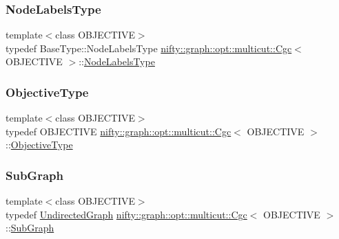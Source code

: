 \subsubsection{\texorpdfstring{Node\+Labels\+Type}{NodeLabelsType}}
{\footnotesize\ttfamily template$<$class O\+B\+J\+E\+C\+T\+I\+VE$>$ \\
typedef Base\+Type\+::\+Node\+Labels\+Type \hyperlink{classnifty_1_1graph_1_1opt_1_1multicut_1_1Cgc}{nifty\+::graph\+::opt\+::multicut\+::\+Cgc}$<$ O\+B\+J\+E\+C\+T\+I\+VE $>$\+::\hyperlink{classnifty_1_1graph_1_1opt_1_1multicut_1_1Cgc_a19f52bf3f00bed2816bd44604b94e7af}{Node\+Labels\+Type}}

\mbox{\label{classnifty_1_1graph_1_1opt_1_1multicut_1_1Cgc_aa83ae7cd167c0580c61f1d4eab63eb9a}} 
\subsubsection{\texorpdfstring{Objective\+Type}{ObjectiveType}}
{\footnotesize\ttfamily template$<$class O\+B\+J\+E\+C\+T\+I\+VE$>$ \\
typedef O\+B\+J\+E\+C\+T\+I\+VE \hyperlink{classnifty_1_1graph_1_1opt_1_1multicut_1_1Cgc}{nifty\+::graph\+::opt\+::multicut\+::\+Cgc}$<$ O\+B\+J\+E\+C\+T\+I\+VE $>$\+::\hyperlink{classnifty_1_1graph_1_1opt_1_1multicut_1_1Cgc_aa83ae7cd167c0580c61f1d4eab63eb9a}{Objective\+Type}}

\mbox{\label{classnifty_1_1graph_1_1opt_1_1multicut_1_1Cgc_a52317a6524a87782b8c6cc8cd27fa9fc}} 
\subsubsection{\texorpdfstring{Sub\+Graph}{SubGraph}}
{\footnotesize\ttfamily template$<$class O\+B\+J\+E\+C\+T\+I\+VE$>$ \\
typedef \hyperlink{classnifty_1_1graph_1_1UndirectedGraph}{Undirected\+Graph} \hyperlink{classnifty_1_1graph_1_1opt_1_1multicut_1_1Cgc}{nifty\+::graph\+::opt\+::multicut\+::\+Cgc}$<$ O\+B\+J\+E\+C\+T\+I\+VE $>$\+::\hyperlink{classnifty_1_1graph_1_1opt_1_1multicut_1_1Cgc_a52317a6524a87782b8c6cc8cd27fa9fc}{Sub\+Graph}}

